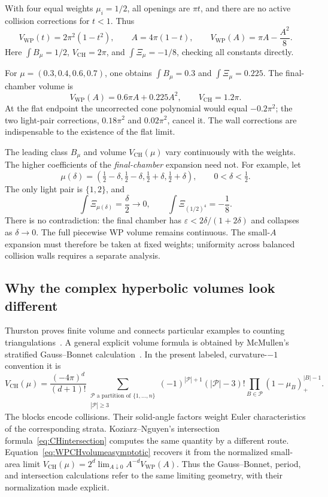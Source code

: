 \documentclass[11pt,a4paper]{article}
\numberwithin{equation}{section}
\theoremstyle{definition}
\theoremstyle{remark}
\newcommand{\WP}{\mathrm{WP}}
\begin{document}
With four equal weights $\mu_i=1/2$, all openings are $\pi t$, and
there are no active collision corrections for $t<1$. Thus
\begin{equation}
 V_{\WP}(t)=2\pi^2(1-t^2),\qquad A=4\pi(1-t),\qquad
 V_{\WP}(A)=\pi A-\frac{A^2}{8}.
 \label{eq:equalflatvolume}
\end{equation}
Here $\int B_\mu=1/2$, $V_{\mathrm{CH}}=2\pi$, and
$\int\Xi_\mu=-1/8$, checking all constants directly.

For $\mu=(0.3,0.4,0.6,0.7)$, one obtains
$\int B_\mu=0.3$ and $\int\Xi_\mu=0.225$. The final-chamber volume is
\[
 V_{\WP}(A)=0.6\pi A+0.225A^2,
 \qquad V_{\mathrm{CH}}=1.2\pi.
\]
At the flat endpoint the uncorrected cone polynomial would equal
$-0.2\pi^2$; the two light-pair corrections, $0.18\pi^2$ and
$0.02\pi^2$, cancel it. The wall corrections are indispensable to
the existence of the flat limit.

The leading class $B_\mu$ and volume $V_{\mathrm{CH}}(\mu)$ vary
continuously with the weights. The higher coefficients of the
\emph{final-chamber} expansion need not. For example, let
\[
 \mu(\delta)=\left(\tfrac12-\delta,\tfrac12-\delta,
                    \tfrac12+\delta,\tfrac12+\delta\right),
 \qquad 0<\delta<\tfrac12.
\]
The only light pair is $\{1,2\}$, and
\[
 \int\Xi_{\mu(\delta)}=\frac\delta2\longrightarrow0,
 \qquad
 \int\Xi_{(1/2)^4}=-\frac18.
\]
There is no contradiction: the final chamber has
$\varepsilon<2\delta/(1+2\delta)$ and collapses as $\delta\to0$.
The full piecewise WP volume remains continuous. The small-$A$
expansion must therefore be taken at fixed weights; uniformity
across balanced collision walls requires a separate analysis.

\subsection{Why the complex hyperbolic volumes look different}

Thurston proves finite volume and connects particular examples to
counting triangulations~\cite{ThurstonShapes}. A general explicit
volume formula is obtained by McMullen's stratified Gauss--Bonnet
calculation~\cite{McMullenGB}. In the present labeled,
curvature-$-1$ convention it is
\begin{equation}
 V_{\mathrm{CH}}(\mu)=\frac{(-4\pi)^d}{(d+1)!}
 \sum_{\substack{\mathcal P\text{ a partition of }\{1,\ldots,n\}\\
                  |\mathcal P|\ge3}}
 (-1)^{|\mathcal P|+1}(|\mathcal P|-3)!
 \prod_{B\in\mathcal P}(1-\mu_B)_+^{|B|-1}.
 \label{eq:McMullenpartitionvolume}
\end{equation}
The blocks encode collisions. Their solid-angle factors weight
Euler characteristics of the corresponding strata. Koziarz--Nguyen's
intersection formula~\eqref{eq:CHintersection} computes the same
quantity by a different route. Equation~\eqref{eq:WPCHvolumeasymptotic}
recovers it from the normalized small-area limit
$V_{\mathrm{CH}}(\mu)=2^d\lim_{A\downarrow0}A^{-d}V_{\WP}(A)$. Thus the
Gauss--Bonnet, period, and intersection calculations refer to the
same limiting geometry, with their normalization made explicit.
\end{document}
